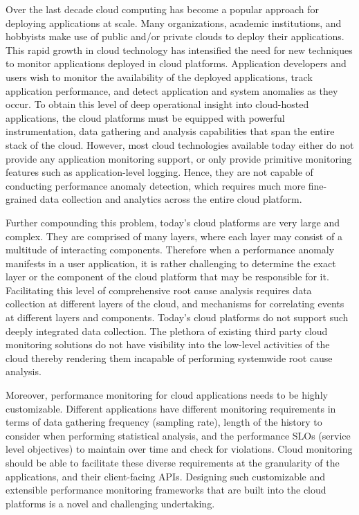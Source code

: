 Over the last decade cloud computing has become a popular approach for deploying
applications at scale. Many organizations, academic institutions, and hobbyists make use of public
and/or private clouds to deploy their applications.
This rapid growth in cloud technology has intensified the need 
for new techniques to
monitor applications deployed in cloud platforms. Application developers and users wish
to monitor the availability of the deployed applications, track application performance, and detect 
application and system anomalies as they occur. To obtain this level of deep operational insight into
cloud-hosted applications, the cloud platforms must be equipped with powerful instrumentation,
data gathering and analysis capabilities that span the entire stack of the cloud. 
However, most cloud technologies available
today either do not provide any application monitoring support, or only provide primitive
monitoring features such as application-level logging. Hence, they are not capable of conducting
performance anomaly detection, which requires much more fine-grained
data collection and analytics across the entire cloud platform.

Further compounding this problem, today's cloud platforms are very large and complex. They are
comprised of many layers, where each layer may consist of a multitude of interacting components.
Therefore when a performance anomaly manifests in a user application, it is rather challenging 
to determine the exact layer or the component of the cloud platform that may be responsible for it. 
Facilitating this level of comprehensive root cause analysis requires
data collection at different layers of the cloud, and mechanisms for correlating events at
different layers and components. Today's cloud platforms do not support such deeply integrated
data collection. The plethora of existing third party cloud monitoring solutions
do not have visibility into the low-level activities of the cloud thereby rendering them incapable
of performing systemwide root cause analysis.

Moreover, performance monitoring for cloud applications needs to be highly customizable. Different
applications have different monitoring requirements in terms of data gathering frequency (sampling rate), 
length of the history to consider when performing statistical analysis, and the performance 
SLOs (service level objectives) to maintain over time and check for violations. Cloud monitoring
should be able to facilitate these diverse requirements at the granularity of the applications, and
their client-facing APIs.
Designing such customizable and extensible performance
monitoring frameworks that are built into the cloud platforms is a novel and challenging undertaking.

